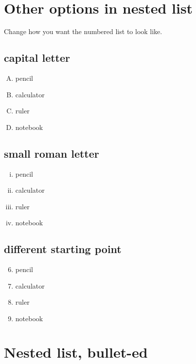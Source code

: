 \documentclass[11pt]{article}
\begin{document}
\vspace{1cm}


\section{Other options in nested list}

Change how you want the numbered list to look like. 

\subsection{capital letter}

\begin{enumerate} [A.]

\item pencil
\item calculator
\item ruler 
\item notebook

\end{enumerate}


\subsection{small roman letter}

\begin{enumerate} [i.]

\item pencil
\item calculator
\item ruler 
\item notebook

\end{enumerate}


\subsection{different starting point}

\begin{enumerate} \setcounter{enumi}{5}

\item pencil
\item calculator
\item ruler 
\item notebook

\end{enumerate}


\pagebreak


\section{Nested list, bullet-ed}
\end{document}
